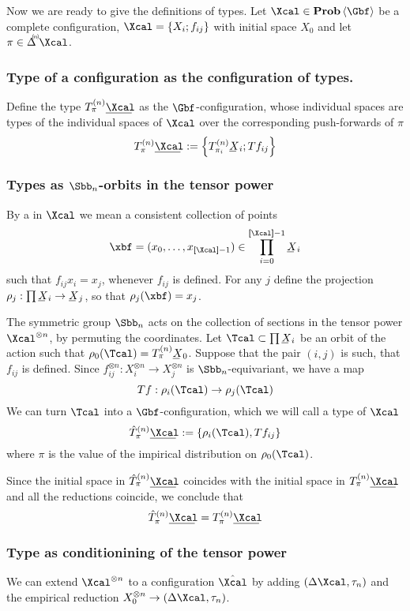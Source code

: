   Now we are ready to give the definitions of types.  Let
  $\Xcal\in\prob\<\Gbf>$ be a complete configuration,
  $\Xcal=\set{X_{i};f_{ij}}$ with initial space $X_{0}$ and let 
  $\pi\in\Deltan \Xcal$.
 

\subsubsection{Type of a configuration as the configuration of types.}
\label{s:type-config-analytic}
  Define the type $T^{(n)}_{\pi}\un\Xcal$ as the $\Gbf$-configuration,
  whose individual spaces are types of the individual spaces of
  $\Xcal$ over the corresponding push-forwards of $\pi$
  \[
  T^{(n)}_{\pi}\un\Xcal
  :=
  \set{T^{(n)}_{\pi_{i}}\un X_{i};T f_{ij}}
  \]
\subsubsection{Types as $\Sbb_{n}$-orbits in the tensor power}
\label{s:type-config-symmetric}
  By a  in $\Xcal$ we mean a consistent collection of points
  \[
  \xbf=(x_{0},\ldots,x_{\size{\Xcal}-1})\in \prod_{i=0}^{\size{\Xcal}-1}\un X_{i}
  \]
  such that $f_{ij}x_{i}=x_{j}$, whenever $f_{ij}$ is defined.  For
  any $j$ define the projection
  $\rho_{j}:\prod\un X_{i}\to\un X_{j}$, so that
  $\rho_{j}(\xbf)=x_{j}$.

  The symmetric group $\Sbb_{n}$ acts on the collection of sections in
  the tensor power $\Xcal^{\otimes n}$, by permuting the coordinates.
  Let $\Tcal\subset\prod\un X_{i}$ be an orbit of the action such that
  $\rho_{0}(\Tcal)=T^{(n)}_{\pi}\un X_{0}$.  Suppose
  that the pair $(i,j)$ is such, that $f_{ij}$ is defined. Since
  $f_{ij}^{\otimes n}:X_{i}^{\otimes n}\to X_{j}^{\otimes n}$ is
  $\Sbb_{n}$-equivariant, we have a map
  \[
  Tf:\rho_{i}(\Tcal)\to\rho_{j}(\Tcal)
  \]
  We can turn $\Tcal$ into a $\Gbf$-configuration, which we will call
  a type of $\Xcal$ 
  \[
  \hat T^{(n)}_{\pi}\un\Xcal:=\set{\rho_{i}(\Tcal),Tf_{ij}}
  \]
  where $\pi$ is the value of the impirical distribution on
  $\rho_{0}(\Tcal)$. 
  
  Since the initial space in $\hat T^{(n)}_{\pi}\un\Xcal$ coincides
  with the initial space in $T^{(n)}_{\pi}\un\Xcal$ and all the
  reductions coincide, we conclude that 
  \[
  \hat T^{(n)}_{\pi}\un\Xcal
  =
  T^{(n)}_{\pi}\un\Xcal
  \]

\subsubsection{Type as conditionining of the tensor power}
\label{s:type-config-synthetic}
  We can extend $\Xcal^{\otimes n}$ to a configuration $\hat{\Xcal}$ by
  adding $(\Delta \Xcal, \tau_n)$ and the empirical reduction
  $X_0^{\otimes n}\to (\Delta \Xcal, \tau_n)$.
  
